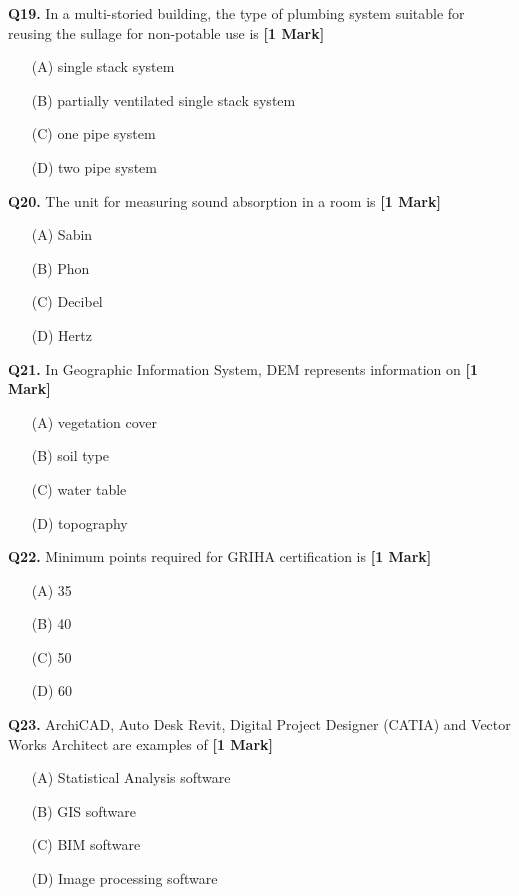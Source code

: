 \documentclass[11pt]{article}
\newcommand{\questiona}[2]{
    \noindent\textbf{Q#2.} #1 \hfill \textbf{[1 Mark]}
}
\begin{document}
\vspace{0.5cm}

\questiona{In a multi-storied building, the type of plumbing system suitable for reusing the sullage for non-potable use is}{19}
\begin{enumerate}
    \item[(A)] single stack system
    \item[(B)] partially ventilated single stack system  
    \item[(C)] one pipe system
    \item[(D)] two pipe system
\end{enumerate}

\vspace{0.5cm}

\questiona{The unit for measuring sound absorption in a room is}{20}
\begin{enumerate}
    \item[(A)] Sabin
    \item[(B)] Phon  
    \item[(C)] Decibel
    \item[(D)] Hertz
\end{enumerate}

\vspace{0.5cm}

\questiona{In Geographic Information System, DEM represents information on}{21}
\begin{enumerate}
    \item[(A)] vegetation cover
    \item[(B)] soil type  
    \item[(C)] water table
    \item[(D)] topography
\end{enumerate}

\vspace{0.5cm}

\questiona{Minimum points required for GRIHA certification is}{22}
\begin{enumerate}
    \item[(A)] 35
    \item[(B)] 40  
    \item[(C)] 50
    \item[(D)] 60
\end{enumerate}

\vspace{0.5cm}

\questiona{ArchiCAD, Auto Desk Revit, Digital Project Designer (CATIA) and Vector Works Architect are examples of}{23}
\begin{enumerate}
    \item[(A)] Statistical Analysis software
    \item[(B)] GIS software  
    \item[(C)] BIM software
    \item[(D)] Image processing software
\end{enumerate}
\end{document}
